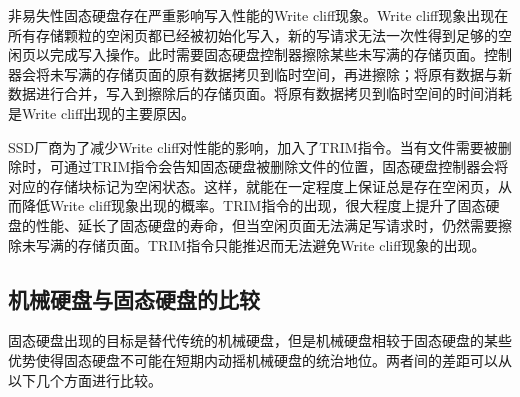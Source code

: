 \begin{enumerate}
非易失性固态硬盘存在严重影响写入性能的Write cliff现象。Write cliff现象出现在所有存储颗粒的空闲页都已经被初始化写入，新的写请求无法一次性得到足够的空闲页以完成写入操作。此时需要固态硬盘控制器擦除某些未写满的存储页面。控制器会将未写满的存储页面的原有数据拷贝到临时空间，再进擦除；将原有数据与新数据进行合并，写入到擦除后的存储页面。将原有数据拷贝到临时空间的时间消耗是Write cliff出现的主要原因。

SSD厂商为了减少Write cliff对性能的影响，加入了TRIM指令。当有文件需要被删除时，可通过TRIM指令会告知固态硬盘被删除文件的位置，固态硬盘控制器会将对应的存储块标记为空闲状态。这样，就能在一定程度上保证总是存在空闲页，从而降低Write cliff现象出现的概率。TRIM指令的出现，很大程度上提升了固态硬盘的性能、延长了固态硬盘的寿命，但当空闲页面无法满足写请求时，仍然需要擦除未写满的存储页面。TRIM指令只能推迟而无法避免Write cliff现象的出现。
\end{enumerate}

\subsection{机械硬盘与固态硬盘的比较}
固态硬盘出现的目标是替代传统的机械硬盘，但是机械硬盘相较于固态硬盘的某些优势使得固态硬盘不可能在短期内动摇机械硬盘的统治地位。两者间的差距可以从以下几个方面进行比较。

